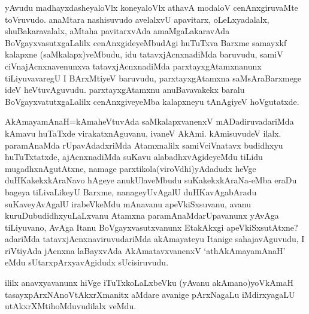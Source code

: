 \begin{artha}
yAvudu madhayxdasheyaloVlx koneyaloVlx athavA modaloV cenAnxgiruvaMte toVruvudo. anaMtara nashisuvudo avelalxvU apavitarx, oLeLxyadalalx, shuBakaravalalx, aMtaha pavitarxvAda amaMgaLakaravAda BoVgayxvasutxgaLalilx cenAnxgideyeMbudAgi huTuTxva Barxme samayxkf kalapxne (saMkalapx)veMbudu, idu tatavxjAcnxnadiMda baruvudu, samiV ciVnajAcnxnavenunxva tatavxjAcnxnadiMda parxtayxgAtamxnanunx tiLiyuvavaregU I BArxMtiyeV baruvudu, parxtayxgAtamxna saMsAraBarxmege ideV heVtuvAguvudu. parxtayxgAtamxnu anuBavavakekx baralu BoVgayxvatutxgaLalilx cenAnxgiveyeMba kalapxneyu tAnAgiyeV hoVgutatxde.
\end{artha}

\begin{artha}
AkAmayamAnaH=kAmaheVtuvAda saMkalapxvanenxV mADadiruvadariMda kAmavu huTaTxde virakatxnAguvanu, ivaneV AkAmi. kAmisuvudeV ilalx. paramAnaMda rUpavAdadxriMda Atamxnalilx samiVciVnatavx budidhxyu huTuTxtatxde, ajAcnxnadiMda suKavu alabadhxvAgideyeMdu tiLidu mugadhxnAgutAtxne, namage parxtikola(viroVdhi)yAdadudx heVge duHKakekxkAraNavo hAgeye anukUlaveMbudu suKakekxkAraNa-eMba eraDu bageya tiLivaLikeyU Barxme, nanageyUvAgalU duHKavAgabAradu suKaveyAvAgalU irabeVkeMdu mAnavanu apeVkiSxsuvanu, avanu kuruDubudidhxyuLaLxvanu Atamxna paramAnaMdarUpavanunx yAvAga tiLiyuvano, AvAga Itanu BoVgayxvasutxvanunx EtakAkxgi apeVkiSxsutAtxne? adariMda tatavxjAcnxnaviruvudariMda akAmayateyu Itanige sahajavAguvudu, I riVtiyAda jAcnxna laBayxvAda AkAmatavxvanenxV `athAkAmayamAnaH' eMdu sUtarxpArxyavAgidudx sUcisiruvudu. 
\end{artha}

\begin{artha}
ililx anavxyavanunx hiVge iTuTxkoLaLxbeVku (yAvanu akAmano)yoV\s kAmaH tasayxpArxNAnoVtAkxrXmanitx aMdare avanige pArxNagaLu iMdirxyagaLU utAkxrXMtihoMduvudilalx veMdu.
\end{artha}


